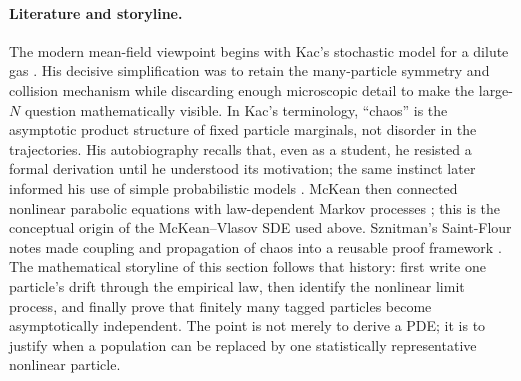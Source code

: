 \documentclass[11pt]{amsart}
\numberwithin{equation}{section}
\theoremstyle{plain}
\begin{document}
\paragraph{\textbf{Literature and storyline.}}
The modern mean-field viewpoint begins with Kac's stochastic model for a
dilute gas \cite{Kac1956}.  His decisive simplification was to retain the
many-particle symmetry and collision mechanism while discarding enough
microscopic detail to make the large-$N$ question mathematically visible.
In Kac's terminology, ``chaos'' is the asymptotic product structure of fixed
particle marginals, not disorder in the trajectories.  His autobiography
recalls that, even as a student, he resisted a formal derivation until he
understood its motivation; the same instinct later informed his use of simple
probabilistic models \cite{Kac1985Enigmas}.  McKean
then connected nonlinear parabolic equations with law-dependent Markov
processes \cite{McKean1966}; this is the conceptual origin of the
McKean--Vlasov SDE used above.  Sznitman's Saint-Flour notes made coupling and
propagation of chaos into a reusable proof framework \cite{Sznitman1991}.
The mathematical storyline of this section follows that history: first write
one particle's drift through the empirical law, then identify the nonlinear
limit process, and finally prove that finitely many tagged particles become
asymptotically independent.  The point is not merely to derive a PDE; it is to
justify when a population can be replaced by one statistically representative
nonlinear particle.
\end{document}
